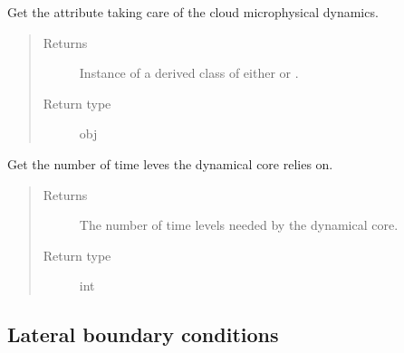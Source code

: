 \documentclass[letterpaper,10pt,english]{sphinxmanual}
\begin{document}
\begin{fulllineitems}
\begin{fulllineitems}
\label{\detokenize{api:tasmania.dycore.dycore_isentropic_nonconservative.DynamicalCoreIsentropicNonconservative.microphysics}}
Get the attribute taking care of the cloud microphysical dynamics.
\begin{quote}\begin{description}
\item[{Returns}] \leavevmode
Instance of a derived class of either 
or {\hyperref[\detokenize{api:tasmania.parameterizations.adjustments.AdjustmentMicrophysics}]{}}.

\item[{Return type}] \leavevmode
obj

\end{description}\end{quote}

\end{fulllineitems}


\begin{fulllineitems}
\label{\detokenize{api:tasmania.dycore.dycore_isentropic_nonconservative.DynamicalCoreIsentropicNonconservative.time_levels}}
Get the number of time leves the dynamical core relies on.
\begin{quote}\begin{description}
\item[{Returns}] \leavevmode
The number of time levels needed by the dynamical core.

\item[{Return type}] \leavevmode
int

\end{description}\end{quote}

\end{fulllineitems}


\end{fulllineitems}



\subsection{Lateral boundary conditions}
\label{\detokenize{api:lateral-boundary-conditions}}
\end{document}
